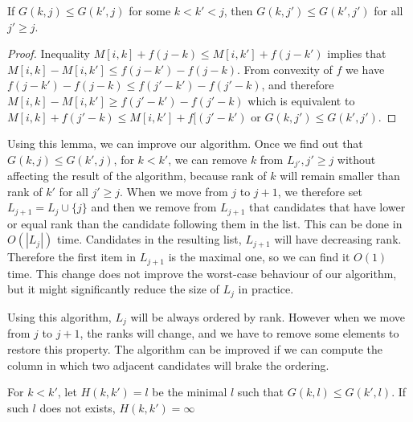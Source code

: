 \begin{lemma}\label{OneStrikeAndOut}
If $G(k,j)\leq G(k',j)$ for some $k<k'<j$, then
$G(k,j')\leq G(k',j')$ for all $j'\geq j$. 
\end{lemma}


\begin{proof}

Inequality $M[i,k]+f(j-k)\leq M[i,k']+f(j-k')$ implies that
$M[i,k]-M[i,k']\leq f(j-k')-f(j-k)$. From convexity of $f$ we have
$f(j-k')-f(j-k)\leq f(j'-k')-f(j'-k)$, and therefore
$M[i,k]-M[i,k']\geq f(j'-k')-f(j'-k)$ which 
is equivalent to
$M[i,k]+f(j'-k)\leq M[i,k']+f[(j'-k')$ or $G(k,j')\leq G(k',j')$.

\end{proof}

Using this lemma, we can improve our algorithm.
Once we find out that $G(k,j)\leq
G(k',j)$, for $k<k'$, we can remove $k$ from $L_{j'}, j'\geq j$ without
affecting the result
of the algorithm, because rank of $k$ will remain smaller than rank of $k'$ for
all $j'\geq j$.
When we move from $j$ to $j+1$, we therefore set $L_{j+1}=L_{j}\cup\{j\}$ and
then
we remove from $L_{j+1}$ that candidates that have lower or equal rank than the 
candidate following them in the list.
This can be done in $O(|L_{j}|)$ time. Candidates in the resulting list,
$L_{j+1}$ will have decreasing rank. Therefore the first item in
$L_{j+1}$ is the maximal one, so we can find it $O(1)$ time.  This change
does not improve the worst-case behaviour of our algorithm, but it might
significantly reduce the  size of $L_j$ in practice. 


Using this algorithm, $L_j$ will be always ordered by rank. However when we move
from $j$ to $j+1$, the ranks will change, and we have to remove some elements 
to restore this property. The algorithm can be improved if we can compute the column in
which two adjacent  candidates will brake the ordering.

\begin{definition}
For $k<k'$, let $H(k,k')=l$ be the minimal $l$ such that $G(k,l)\leq G(k',l)$. If such $l$ does
not exists,  $H(k,k')=\infty$ 
\end{definition}


